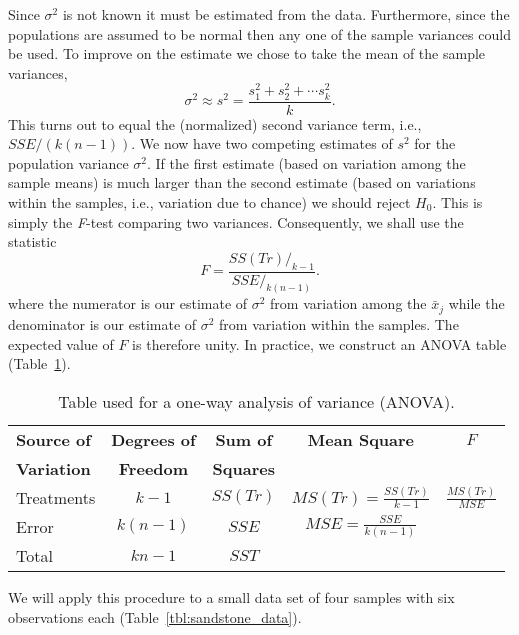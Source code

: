 	Since $\sigma^2$ is not known it must be estimated from the data.  Furthermore, since the populations are assumed to be normal then any 
one of the sample variances could be used.  To improve on the estimate we chose to take the mean of the sample variances,
\begin{equation}
\sigma^2 \approx s^2 = \frac{s^2_1 + s^2_2 + \cdots s^2_k}{k}.
\end{equation}	 
This turns out to equal the (normalized) second variance term, i.e., $SSE/(k(n-1))$.  We now have two competing estimates of $s^2$ for the population 
variance $\sigma^2$.  If the first estimate (based on variation among the sample means) is much larger 
than the second estimate (based on variations within the samples, i.e., variation due to chance) we 
should reject $H_0$.   This is simply the \emph{F}-test comparing two variances.  Consequently, we shall use the 
statistic
\begin{equation}
F = \frac{SS(Tr)/_{k-1}}{SSE/_{k(n-1)}}.
\end{equation}
where the numerator is our estimate of $\sigma^2$ from variation among the $\bar{x}_j$ while the
denominator is our estimate of $\sigma^2$ from variation within the samples.  The expected value of $F$ is therefore unity.
In practice, we construct an ANOVA table (Table~\ref{tbl:one_way_ANOVA}).
\begin{table}[H]
\center
\begin{tabular}{|l|c|c|c|c|} \hline
\bf{Source of} & \bf{Degrees of} & \bf{Sum of} & \bf{Mean Square} & $F$ \\ 
\bf{Variation} & \bf{Freedom} & \bf{Squares} & &  \\ \hline
\rule{0pt}{4ex}Treatments & $k - 1$ & $SS(Tr)$ & $MS(Tr) = \displaystyle \frac{SS(Tr)}{k-1}$ & $ \displaystyle \frac{MS(Tr)}{MSE}$\\[9pt]  \hline
\rule{0pt}{4ex}Error & $k(n - 1)$ & $SSE$ &  $MSE = \displaystyle \frac{SSE}{k(n-1)}$ &  \\[9pt] \hline
Total & $kn-1$ & $SST$ & & \\ \hline
\end{tabular}
\caption{Table used for a one-way analysis of variance (ANOVA).}
\label{tbl:one_way_ANOVA}
\end{table}
We will apply this procedure to a small data set of four samples with six observations each (Table~\ref{tbl:sandstone_data}).
